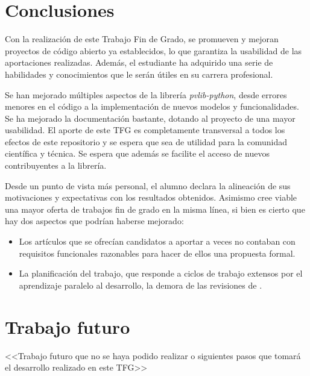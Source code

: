 
\section{Conclusiones} \label{sct:resultados:conclusiones}

Con la realización de este Trabajo Fin de Grado, se promueven y mejoran proyectos de código abierto ya establecidos, lo que garantiza la usabilidad de las aportaciones realizadas. Además, el estudiante ha adquirido una serie de habilidades y conocimientos que le serán útiles en su carrera profesional.

Se han mejorado múltiples aspectos de la librería \textit{pvlib-python}, desde errores menores en el código a la implementación de nuevos modelos y funcionalidades. Se ha mejorado la documentación bastante, dotando al proyecto de una mayor usabilidad. El aporte de este TFG es completamente transversal a todos los efectos de este repositorio y se espera que sea de utilidad para la comunidad científica y técnica. Se espera que además se facilite el acceso de nuevos contribuyentes a la librería.

Desde un punto de vista más personal, el alumno declara la alineación de sus motivaciones y expectativas con los resultados obtenidos. Asimismo cree viable una mayor oferta de trabajos fin de grado en la misma línea, si bien es cierto que hay dos aspectos que podrían haberse mejorado:

\begin{itemize}
    \item Los artículos que se ofrecían candidatos a aportar a veces no contaban con requisitos funcionales razonables para hacer de ellos una propuesta formal.
    \item La planificación del trabajo, que responde a ciclos de trabajo extensos por el aprendizaje paralelo al desarrollo, la demora de las revisiones de .
\end{itemize}


\section{Trabajo futuro} \label{sct:resultados:trabajofuturo}

<<Trabajo futuro que no se haya podido realizar o siguientes pasos que tomará el desarrollo realizado en este TFG>>